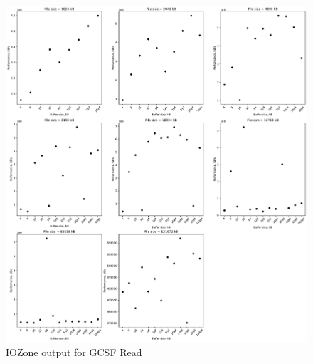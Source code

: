 \begin{figure}[!htb]
	\label{fig:bench_gcsf_read}
	\begin{center}
		\includegraphics[width=1.0\textwidth]{figures/benchmarking/gcsf/Read.pdf}
	\end{center}
	\caption{IOZone output for GCSF Read}
\end{figure}

